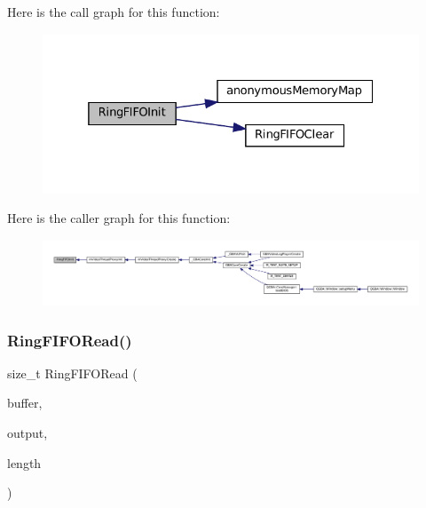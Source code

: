 Here is the call graph for this function\+:
\nopagebreak
\begin{figure}[H]
\begin{center}
\leavevmode
\includegraphics[width=325pt]{ring-fifo_8c_a2dc51a008dd649da7f0ceb1db622b9c3_cgraph}
\end{center}
\end{figure}
Here is the caller graph for this function\+:
\nopagebreak
\begin{figure}[H]
\begin{center}
\leavevmode
\includegraphics[width=350pt]{ring-fifo_8c_a2dc51a008dd649da7f0ceb1db622b9c3_icgraph}
\end{center}
\end{figure}
\mbox{\label{ring-fifo_8c_a77fab9449f08873c068ca91015c0a675}} 
\subsubsection{\texorpdfstring{Ring\+F\+I\+F\+O\+Read()}{RingFIFORead()}}
{\footnotesize\ttfamily size\+\_\+t Ring\+F\+I\+F\+O\+Read (\begin{DoxyParamCaption}\item[{struct Ring\+F\+I\+FO $\ast$}]{buffer,  }\item[{void $\ast$}]{output,  }\item[{size\+\_\+t}]{length }\end{DoxyParamCaption})}

